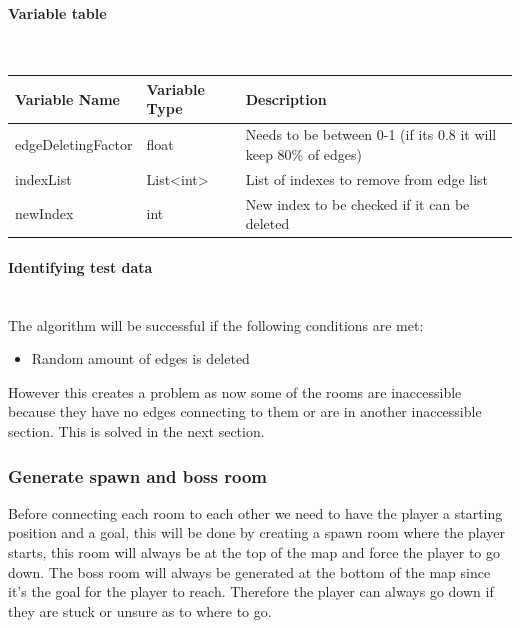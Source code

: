 \documentclass{article}
\newcommand{\parBr}{\vspace{5mm}}%
\newcommand{\myparagraph}[1]{\paragraph{#1}\mbox{}\\} %
\newcommand{\smallBr}{\vspace{1.5mm}}
\begin{document}
\myparagraph{Variable table}
\smallBr
\begin{tabular}{l|l|l}
Variable Name      & Variable Type                    & Description                                                     \\ \hline
edgeDeletingFactor & float                            & Needs to be between 0-1 (if its 0.8 it will keep 80\% of edges) \\
indexList          & List\textless{}int\textgreater{} & List of indexes to remove from edge list                        \\
newIndex           & int                              & New index to be checked if it can be deleted                   
\end{tabular}

\myparagraph{Identifying test data}
The algorithm will be successful if the following conditions are met:
\begin{itemize}
\item{Random amount of edges is deleted}
\end{itemize}

\parBr

However this creates a problem as now some of the rooms are inaccessible because they have no edges connecting to them or are in another inaccessible section. This is solved in the next section.

\subsubsection{Generate spawn and boss room}
Before connecting each room to each other we need to have the player a starting position and a goal, this will be done by creating a spawn room where the player starts, this room will always be at the top of the map and force the player to go down. The boss room will always be generated at the bottom of the map since it's the goal for the player to reach. Therefore the player can always go down if they are stuck or unsure as to where to go. 
\end{document}
